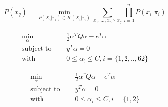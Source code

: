 \documentclass[a4paper, 12pt]{article}
\begin{document}
\begin{sloppypar}





\begin{equation}
    \label{lowbound}
    \underline{P}(x_q) = \min_{P(X_i|\pi_i) \in K(X_i|\pi_i)} \sum_{x_1,...,x_n \backslash x_q} \prod_{i=0}^n P(x_i|\pi_i)
\end{equation}

\begin{equation}
    \label{Chap3:Eq2}
    \begin{split}
        \min_{\alpha}\quad & \frac{1}{2}{\alpha}^{T}Q \alpha - e^T\alpha \\
        \text{subject to } \quad & y^T \alpha = 0 \\
        \text{with } \quad &  0 \leq {\alpha}_i \leq C, i = \{ 1,2,..,62\}
    \end{split}
\end{equation}

\begin{align}
    \min_{\alpha}\quad      & \frac{1}{2}{\alpha}^{T}Q \alpha - e^T\alpha \\
    \text{subject to }\quad & y^T \alpha = 0                              \\
    \text{with }  \quad     & 0 \leq {\alpha}_i \leq C, i = \{ 1,2 \}
\end{align}


\end{sloppypar}
\end{document}
